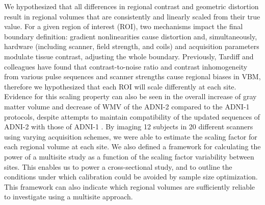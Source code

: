 We hypothesized that all differences in regional contrast and geometric distortion result in regional volumes that are consistently and linearly scaled from their true value. For a given region of interest (ROI), two mechanisms impact the final boundary definition: gradient nonlinearities cause distortion and, simultaneously, hardware  (including scanner, field strength, and coils) and acquisition parameters modulate tissue contrast, adjusting the whole boundary. Previously, Tardiff and colleagues have found that contrast-to-noise ratio and contrast inhomogeneity from various pulse sequences and scanner strengths cause regional biases in VBM\cite{tardif2010regional, tardif2009sensitivity}, therefore we hypothesized that each ROI will scale differently at each site. Evidence for this scaling property can also be seen in the overall increase of gray matter volume and decrease of WMV of the ADNI-2 compared to the ADNI-1 protocols, despite attempts to maintain compatibility of the updated sequences of ADNI-2 with those of ADNI-1 \cite{Brunton_2013}. By imaging 12 subjects in 20 different scanners using varying acquisition schemes, we were able to estimate the scaling factor for each regional volume at each site. We also defined a framework for calculating the power of a multisite study as a function of the scaling factor variability between sites. This enables us to power a cross-sectional study, and to outline the conditions under which calibration could be avoided by sample size optimization. This framework can also indicate which regional volumes are sufficiently reliable to investigate using a multisite approach.